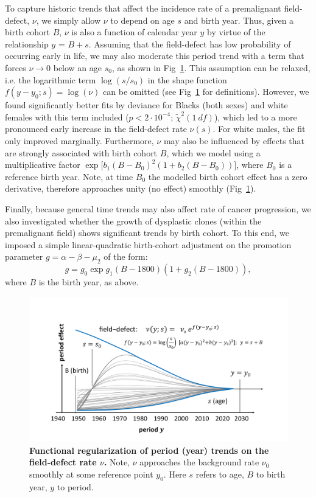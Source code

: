 \documentclass[10pt,letterpaper]{article}
\begin{document}
To capture historic trends that affect the incidence rate of a premalignant field-defect, $\nu$, we simply allow $\nu$ to depend on age $s$ and birth year. Thus, given a birth cohort $B$, $\nu$ is also a function of calendar year $y$ by virtue of the relationship $y$ = $B+s$. Assuming that the field-defect has low probability of occurring early in life, we may also moderate this period trend with a term that forces $\nu \rightarrow 0$ below an age $s_0$, as shown in Fig~\ref{fig2}. This assumption can be relaxed, i.e. the logarithmic term $\log(s/s_0)$ in the shape function $f(y-y_0;s) = \log(\nu)$ can be omitted (see Fig~\ref{fig2} for definitions). However, we found significantly better fits by deviance for Blacks (both sexes) and white females with this term included ($ p < 2\cdot  10^{-4}$; $\tilde{\chi}^2 (1 \ df)$), which led to a more pronounced early increase in the field-defect rate $\nu(s)$. For white males, the fit only improved marginally. Furthermore, $\nu$ may also be influenced by effects that are strongly associated with birth cohort $B$, which we model using a multiplicative factor $\exp \big[b_1 (B-B_0)^2(1+b_2(B-B_0))\big]$, where $B_0$ is a reference birth year. Note, at time $B_0$ the modelled birth cohort effect has a zero derivative, therefore approaches unity (no effect) smoothly (Fig~\ref{fig2}). 

Finally, because general time trends may also affect rate of cancer progression, we also investigated whether the growth of dysplastic clones (within the premalignant field) shows significant trends by birth cohort. To this end, we imposed a simple linear-quadratic birth-cohort adjustment on the promotion parameter $g=\alpha-\beta-\mu_2$ of the form:
$$g=g_0 \exp{g_1(B-1800)(1+g_2(B-1800))},$$
where $B$ is the birth year, as above.  
\medskip
\begin{figure}[!ht]
\begin{adjustwidth}{-1in}{0in} 
\includegraphics[scale=0.5, trim=0 0 0 0]{Fig2.pdf}
\end{adjustwidth}
\caption{{\bf Functional regularization of period (year) trends on the field-defect rate $\nu$.} Note, $\nu$ approaches the background rate $\nu_0$ smoothly at some reference point $y_0$. Here $s$ refers to age, $B$ to birth year, $y$ to period.}
\label{fig2}
\end{figure}
\end{document}
